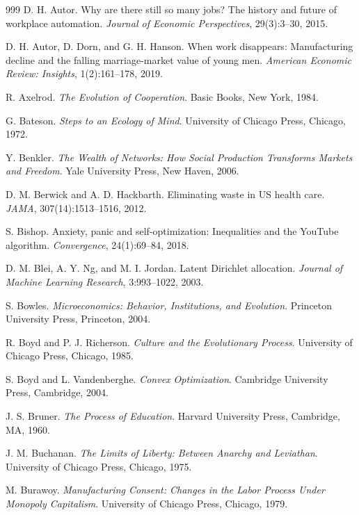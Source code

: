 \documentclass[11pt]{article}
\begin{document}
\begin{thebibliography}{999}
D. H. Autor.
Why are there still so many jobs? The history and future of workplace automation.
\textit{Journal of Economic Perspectives}, 29(3):3--30, 2015.

D. H. Autor, D. Dorn, and G. H. Hanson.
When work disappears: Manufacturing decline and the falling marriage-market value of young men.
\textit{American Economic Review: Insights}, 1(2):161--178, 2019.

R. Axelrod.
\textit{The Evolution of Cooperation}.
Basic Books, New York, 1984.

G. Bateson.
\textit{Steps to an Ecology of Mind}.
University of Chicago Press, Chicago, 1972.

Y. Benkler.
\textit{The Wealth of Networks: How Social Production Transforms Markets and Freedom}.
Yale University Press, New Haven, 2006.

D. M. Berwick and A. D. Hackbarth.
Eliminating waste in US health care.
\textit{JAMA}, 307(14):1513--1516, 2012.

S. Bishop.
Anxiety, panic and self-optimization: Inequalities and the YouTube algorithm.
\textit{Convergence}, 24(1):69--84, 2018.

D. M. Blei, A. Y. Ng, and M. I. Jordan.
Latent Dirichlet allocation.
\textit{Journal of Machine Learning Research}, 3:993--1022, 2003.

S. Bowles.
\textit{Microeconomics: Behavior, Institutions, and Evolution}.
Princeton University Press, Princeton, 2004.

R. Boyd and P. J. Richerson.
\textit{Culture and the Evolutionary Process}.
University of Chicago Press, Chicago, 1985.

S. Boyd and L. Vandenberghe.
\textit{Convex Optimization}.
Cambridge University Press, Cambridge, 2004.

J. S. Bruner.
\textit{The Process of Education}.
Harvard University Press, Cambridge, MA, 1960.

J. M. Buchanan.
\textit{The Limits of Liberty: Between Anarchy and Leviathan}.
University of Chicago Press, Chicago, 1975.

M. Burawoy.
\textit{Manufacturing Consent: Changes in the Labor Process Under Monopoly Capitalism}.
University of Chicago Press, Chicago, 1979.


\end{thebibliography}
\end{document}
